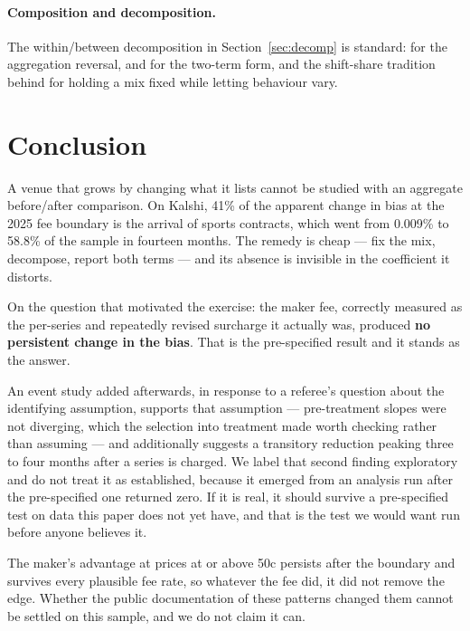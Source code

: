 \documentclass[preprint,12pt,authoryear]{elsarticle}
\begin{document}
\paragraph{Composition and decomposition.} The within/between decomposition in
Section~\ref{sec:decomp} is standard: \citet{simpson1951} for the aggregation
reversal, \citet{oaxaca1973} and \citet{blinder1973} for the two-term form, and
the shift-share tradition behind \citet{bartik1991} for holding a mix fixed
while letting behaviour vary.

\section{Conclusion}

A venue that grows by changing what it lists cannot be studied with an aggregate
before/after comparison. On Kalshi, 41\% of the apparent change in bias at the
2025 fee boundary is the arrival of sports contracts, which went from 0.009\% to
58.8\% of the sample in fourteen months. The remedy is cheap --- fix the mix,
decompose, report both terms --- and its absence is invisible in the coefficient
it distorts.

On the question that motivated the exercise: the maker fee, correctly measured
as the per-series and repeatedly revised surcharge it actually was, produced
\textbf{no persistent change in the bias}. That is the pre-specified result and
it stands as the answer.

An event study added afterwards, in response to a referee's question about the
identifying assumption, supports that assumption --- pre-treatment slopes were
not diverging, which the selection into treatment made worth checking rather
than assuming --- and additionally suggests a transitory reduction peaking three
to four months after a series is charged. We label that second finding
exploratory and do not treat it as established, because it emerged from an
analysis run after the pre-specified one returned zero. If it is real, it should
survive a pre-specified test on data this paper does not yet have, and that is
the test we would want run before anyone believes it.

The maker's advantage at prices at or above 50c persists after the boundary and
survives every plausible fee rate, so whatever the fee did, it did not remove
the edge. Whether the public documentation of these patterns changed them cannot
be settled on this sample, and we do not claim it can.
\end{document}
